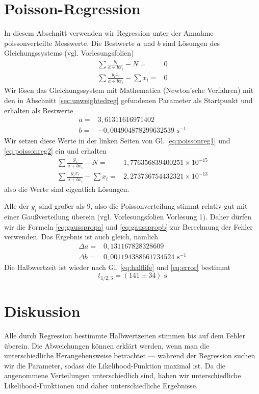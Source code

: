 \documentclass[prb,12pt]{revtex4-2}
\theoremstyle{definition}
\theoremstyle{definition}
\begin{document}
\section{Poisson-Regression}\label{sec:poissonreg}
In diesem Abschnitt verwenden wir Regression unter der Annahme poissonverteilte Messwerte. Die Bestwerte $a$ und $b$ sind Lösungen des Gleichungssystems (vgl. Vorlesungsfolien)
\begin{align}
	\sum\frac{y_i}{a+bx_i}-N=&0\label{eq:poissonreg1}\\
	\sum\frac{y_i x_i}{a+b x_i}-\sum x_i=&0\label{eq:poissonreg2}
\end{align}
Wir lösen das Gleichungssystem mit Mathematica (Newton'sche Verfahren) mit den in Abschnitt \ref{sec:unweightedreg} gefundenen Parameter als Startpunkt und erhalten als Bestwerte
\begin{align*}
	a=& 3,61311616971402\\
	b=& -0,004904878299632539\text{ s}^{-1}
\end{align*}
Wir setzen diese Werte in der linken Seiten von Gl. \eqref{eq:poissonreg1} und \eqref{eq:poissonreg2} ein und erhalten
\begin{align*}
	\sum\frac{y_i}{a+bx_i}-N=&1,776356839400251\times 10^{-15}\\
	\sum\frac{y_i x_i}{a+b x_i}-\sum x_i=&2,273736754432321\times 10^{-13}
\end{align*}
also die Werte sind eigentlich Lösungen.

Alle der $y_i$ sind großer als 9, also die Poissonverteilung stimmt relativ gut mit einer Gaußverteilung überein (vgl. Vorlesungsfolien Vorlesung 1).  Daher dürfen wir die Formeln \eqref{eq:gausspropa} und \eqref{eq:gausspropb} zur Berechnung der Fehler verwenden. Das Ergebnis ist auch gleich, nämlich
\begin{align*}
	\Delta a=&0,131167828328609\\
	\Delta b=& 0,001194388661734524\text{ s}^{-1}
\end{align*}
Die Halbwertzeit ist wieder nach Gl. \eqref{eq:halflife} und \eqref{eq:error} bestimmt
\[t_{1/2,3}=(141\pm 34)\text{ s} \]
\section{Diskussion}
Alle durch Regression bestimmte Halbwertzeiten stimmen bis auf dem Fehler überein. Die Abweichungen können erklärt werden, wenn man die unterschiedliche Herangehensweise betrachtet --- während der Regression suchen wir die Parameter, sodass die Likelihood-Funktion maximal ist. Da die angenommene Verteilungen unterschiedlich sind, haben wir unterschiedliche Likelihood-Funktionen und daher unterschiedliche Ergebnisse.
\end{document}
